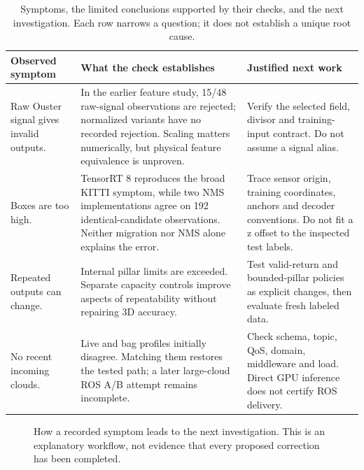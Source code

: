 \documentclass[11pt,a4paper]{article}
\begin{document}
\begin{table}[htbp]
\centering\small
\begin{tabularx}{\linewidth}{@{}YYY@{}}
\toprule
Observed symptom & What the check establishes & Justified next work \\ \midrule
Raw Ouster signal gives invalid outputs. & In the earlier feature study, 15/48 raw-signal observations are rejected; normalized variants have no recorded rejection. Scaling matters numerically, but physical feature equivalence is unproven. & Verify the selected field, divisor and training-input contract. Do not assume a signal alias. \\
Boxes are too high. & TensorRT 8 reproduces the broad KITTI symptom, while two NMS implementations agree on 192 identical-candidate observations. Neither migration nor NMS alone explains the error. & Trace sensor origin, training coordinates, anchors and decoder conventions. Do not fit a z offset to the inspected test labels. \\
Repeated outputs can change. & Internal pillar limits are exceeded. Separate capacity controls improve aspects of repeatability without repairing 3D accuracy. & Test valid-return and bounded-pillar policies as explicit changes, then evaluate fresh labeled data. \\
No recent incoming clouds. & Live and bag profiles initially disagree. Matching them restores the tested path; a later large-cloud ROS A/B attempt remains incomplete. & Check schema, topic, QoS, domain, middleware and load. Direct GPU inference does not certify ROS delivery. \\
\bottomrule
\end{tabularx}
\caption{Symptoms, the limited conclusions supported by their checks, and the next investigation. Each row narrows a question; it does not establish a unique root cause.}
\label{tab:diagnostic-evidence}
\end{table}

\begin{figure}[htbp]
\centering
{}
\caption{How a recorded symptom leads to the next investigation. This is an explanatory workflow, not evidence that every proposed correction has been completed.}
\label{fig:diagnostic-workflow}
\end{figure}
\end{document}
